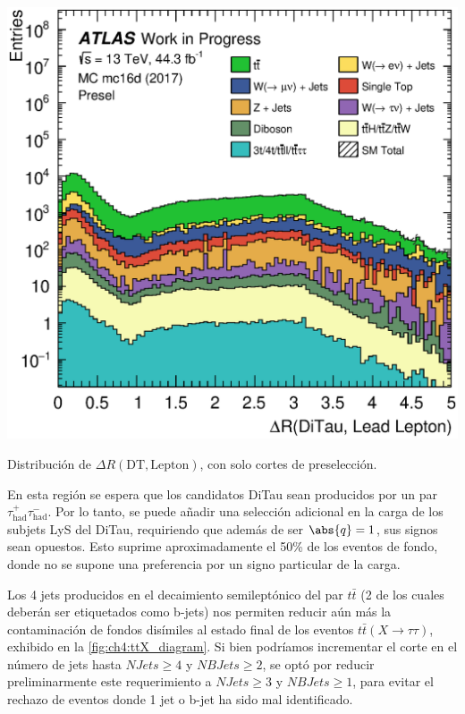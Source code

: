 \begin{marginfigure}
    \includegraphics[width=0.99\linewidth]{Assets/Plots/Presel/h_stack_mc16d_ditau_lepton_dr.eps}
    \caption{Distribución de $\Delta R(\text{DT}, \text{Lepton})$, con solo cortes de preselección.}
    \label{fig:ch4:presel:h_ditau_lepton_dr}
\end{marginfigure}

En esta región se espera que los candidatos DiTau sean producidos por un par $\tau^+_{\text{had}} \tau^-_{\text{had}}$. Por lo tanto, se puede añadir una selección adicional en la carga de los subjets LyS del DiTau, requiriendo que además de ser $\abs{q} = 1$, sus signos sean opuestos. Esto suprime aproximadamente el 50\% de los eventos de fondo, donde no se supone una preferencia por un signo particular de la carga.

Los 4 jets producidos en el decaimiento semileptónico del par $t\bar{t}$ (2 de los cuales deberán ser etiquetados como b-jets) nos permiten reducir aún más la contaminación de fondos disímiles al estado final de los eventos $t\bar{t}(X\to\tau\tau)$, exhibido en la \cref{fig:ch4:ttX_diagram}. Si bien podríamos incrementar el corte en el número de jets hasta $NJets \geq 4$ y $NBJets \geq 2$, se optó por reducir preliminarmente este requerimiento a $NJets \geq 3$ y $NBJets \geq 1$, para evitar el rechazo de eventos donde 1 jet o b-jet ha sido mal identificado.


